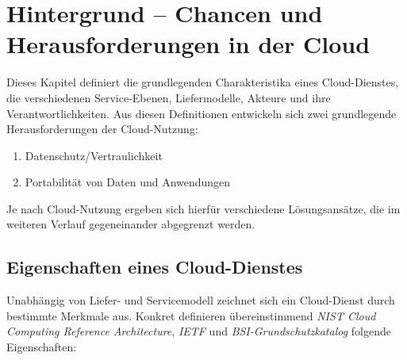 \chapter{Hintergrund -- Chancen und Herausforderungen in der Cloud}

Dieses Kapitel definiert die grundlegenden Charakteristika eines Cloud-Dienstes, die verschiedenen Service-Ebenen, Liefermodelle, Akteure und ihre Verantwortlichkeiten. Aus diesen Definitionen entwickeln sich zwei grundlegende Herausforderungen der Cloud-Nutzung:

\begin{enumerate}
	\item Datenschutz/Vertraulichkeit
	\item Portabilität von Daten und Anwendungen
\end{enumerate}

\noindent Je nach Cloud-Nutzung ergeben sich hierfür verschiedene Lösungsansätze, die im weiteren Verlauf gegeneinander abgegrenzt werden.

\section{Eigenschaften eines Cloud-Dienstes}

Unabhängig von Liefer- und Servicemodell zeichnet sich ein Cloud-Dienst durch bestimmte Merkmale aus. Konkret definieren übereinstimmend \emph{NIST Cloud Computing Reference Architecture}, \emph{IETF} und \emph{BSI-Grundschutzkatalog} \cite{nist:2011:reference-architecture, ietf:2015:reference-framework, bsi:2014:grundschutz} folgende Eigenschaften:

